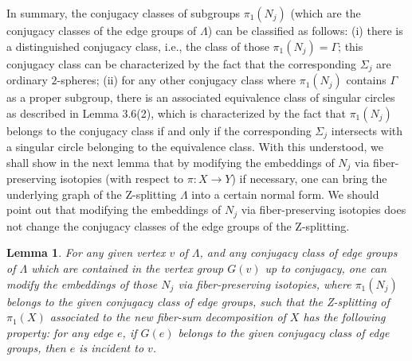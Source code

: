 \documentclass[11pt]{amsart}
\theoremstyle{plain}
\numberwithin{theorem}{section}
\newtheorem{lemma}[theorem]{Lemma}
\theoremstyle{definition}
\begin{document}
In summary, the conjugacy classes of subgroups $\pi_1(N_j)$ (which are the conjugacy classes
of the edge groups of $\Lambda$) can be classified as follows: (i) there is a distinguished 
conjugacy class, i.e., the class of those $\pi_1(N_j)=\Gamma$; this conjugacy class can be 
characterized by the fact that the corresponding $\Sigma_j$ are ordinary $2$-spheres; (ii) for
any other conjugacy class where $\pi_1(N_j)$ contains $\Gamma$ as a proper subgroup, there
is an associated equivalence class of singular circles as described in Lemma 3.6(2), which
is characterized by the fact that $\pi_1(N_j)$ belongs to the conjugacy class if and only if the
corresponding $\Sigma_j$ intersects with a singular circle belonging to the equivalence
class. With this understood, we shall show in the next lemma that by modifying the embeddings
of $N_j$ via fiber-preserving isotopies (with respect to $\pi:X\rightarrow Y$) if necessary, one can bring the underlying graph of the Z-splitting $\Lambda$ into a certain normal form. We should 
point out that modifying the embeddings of $N_j$ via fiber-preserving isotopies does not 
change the conjugacy classes of the edge groups of the Z-splitting.

\begin{lemma}
For any given vertex $v$ of $\Lambda$, and any conjugacy class of edge groups of $\Lambda$
which are contained in the vertex group $G(v)$ up to conjugacy, one can modify
the embeddings of those $N_j$ via fiber-preserving isotopies, where $\pi_1(N_j)$ belongs to the given conjugacy class of edge groups, such that the Z-splitting of $\pi_1(X)$ associated to the
new fiber-sum decomposition of $X$ has the following property: for any edge $e$, if $G(e)$ 
belongs to the given conjugacy class of edge groups, then $e$ is incident to $v$. 
\end{lemma}
\end{document}
